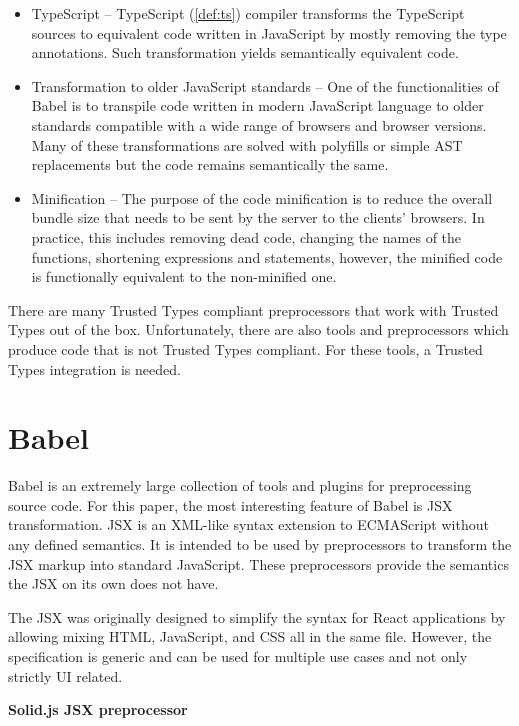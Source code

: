 \begin{itemize}
  \item TypeScript -- TypeScript (\ref{def:ts}) compiler transforms the TypeScript sources to
        equivalent code written in JavaScript by mostly removing the type annotations. Such
        transformation yields semantically equivalent code.
  \item Transformation to older JavaScript standards -- One of the functionalities of Babel is to
        transpile code written in modern JavaScript language to older standards compatible with a
        wide range of browsers and browser versions. Many of these transformations are solved with
        polyfills or simple AST replacements but the code remains semantically the same.
  \item Minification -- The purpose of the code minification is to reduce the overall bundle size
        that needs to be sent by the server to the clients' browsers. In practice, this includes
        removing dead code, changing the names of the functions, shortening expressions and
        statements, however, the minified code is functionally equivalent to the non-minified one.
\end{itemize}

There are many Trusted Types compliant preprocessors that work with Trusted Types out of the box.
Unfortunately, there are also tools and preprocessors which produce code that is not Trusted Types
compliant. For these tools, a Trusted Types integration is needed.

\section{Babel}

Babel is an extremely large collection of tools and plugins for preprocessing source code. For this
paper, the most interesting feature of Babel is JSX transformation. JSX is an XML-like syntax
extension to ECMAScript without any defined semantics. It is intended to be used by preprocessors to
transform the JSX markup into standard JavaScript. These preprocessors provide the semantics the JSX
on its own does not have.

The JSX was originally designed to simplify the syntax for React applications by allowing mixing
HTML, JavaScript, and CSS all in the same file. However, the specification \cite{jsx_spec} is
generic and can be used for multiple use cases and not only strictly UI related.

\medskip
\begin{flushleft}\textbf {Solid.js JSX preprocessor}\end{flushleft}
\medskip
\label{jsx_solid_preprocessor}

